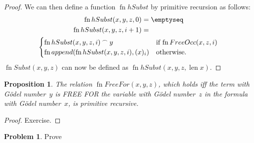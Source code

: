 \documentclass[10pt,a4paper]{article}
\makeatletter
\newcommand*{\olup}[1]{\MakeUppercase{#1}}
\theoremstyle{plain}
\newtheorem{prop}[thm]{Proposition}
\theoremstyle{definition}
\newtheorem{prob}{Problem}[section]
\theoremstyle{remark}
\newcommand*{\ollabel}[1]{\label{#1}}
\newcommand{\olref}{\@ifnextchar[{\olref@i}{\olref@final}}
\def\olref@i[#1]{\@ifnextchar[{\olref@ii}{\olref@final}}
\def\olref@ii[#1]{\@ifnextchar[{\olref@iii}{\olref@final}}
\def\olref@iii[#1]{\olref@final}
\def\olref@final#1{\ref{#1}}
\providecommand{\len}{\operatorname{len}}
\providecommand{\concat}{\mathbin{{}^\frown}}
\providecommand{\fn}{\operatorname{fn}}
\makeatother
\begin{document}
\begin{proof}
We can then define a function $\fn{hSubst}$ by primitive recursion as
follows:
\begin{multline*}
\begin{aligned}
\fn{hSubst}(x, y, z, 0) & = \emptyseq \\
\fn{hSubst}(x, y, z, i+1) & =
\end{aligned}\\
\begin{cases}
\fn{hSubst}(x, y, z, i) \concat y & \text{if $\fn{FreeOcc}(x, z, i)$} \\
\fn{append}(\fn{hSubst}(x, y, z, i), (x)_{i}) & \text{otherwise.}
\end{cases}
\end{multline*}
$\fn{Subst}(x, y, z)$ can now be defined as $\fn{hSubst}(x, y, z, \len{x})$.
\end{proof}

\begin{prop}
\ollabel{prop:free-for}
The relation $\fn{FreeFor}(x, y, z)$, which holds iff the term with
G\"odel number~$y$ is \olup{free for} the variable with G\"odel
number~$z$ in the formula with G\"odel number~$x$, is primitive
recursive.
\end{prop}

\begin{proof} Exercise. \end{proof}

\begin{prob}
Prove \olref[inc][art][sub]{prop:free-for}
\end{prob}
\end{document}
